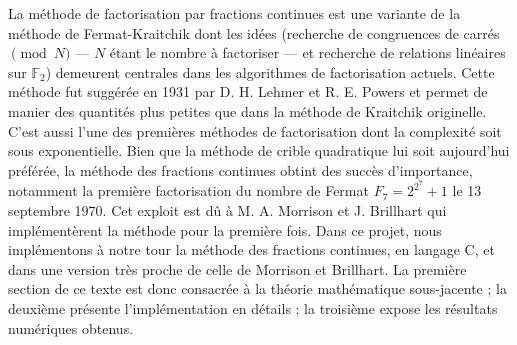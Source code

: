 
La méthode de factorisation par fractions continues est une variante de la
méthode de Fermat-Kraitchik dont les idées (recherche de congruences de carrés
$\pmod{N}$ — $N$ étant le nombre à factoriser — et recherche de relations
linéaires sur $\mathbb{F}_2$) demeurent centrales dans les algorithmes de
factorisation actuels. Cette méthode fut suggérée en 1931 par D. H. Lehmer et
R. E. Powers et permet de manier des quantités plus petites que dans la méthode
de Kraitchik originelle. C'est aussi l'une des premières méthodes de
factorisation dont la complexité soit sous exponentielle. Bien que la méthode
de crible quadratique lui soit aujourd'hui préférée, la méthode des fractions
continues obtint des succès d'importance, notamment la première factorisation
du nombre de Fermat $F_7 = 2^{2^7} + 1$ le 13 septembre 1970. Cet exploit est
dû à M. A. Morrison et J. Brillhart qui implémentèrent la méthode pour la
première fois. Dans ce projet, nous implémentons à notre tour la méthode des
fractions continues, en langage C, et dans une version très proche de celle de
Morrison et Brillhart. La première section de ce texte est donc consacrée à la
théorie mathématique sous-jacente ; la deuxième présente l'implémentation en
détails ; la troisième expose les résultats numériques obtenus.
